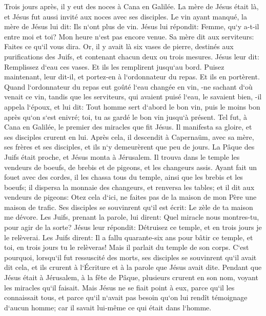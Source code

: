\verse Trois jours après, il y eut des noces à Cana en Galilée. La mère de Jésus était là, 
\verse et Jésus fut aussi invité aux noces avec ses disciples. 
\verse Le vin ayant manqué, la mère de Jésus lui dit: Ils n`ont plus de vin. 
\verse Jésus lui répondit: Femme, qu`y a-t-il entre moi et toi? Mon heure n`est pas encore venue. 
\verse Sa mère dit aux serviteurs: Faites ce qu`il vous dira. 
\verse Or, il y avait là six vases de pierre, destinés aux purifications des Juifs, et contenant chacun deux ou trois mesures. 
\verse Jésus leur dit: Remplissez d`eau ces vases. Et ils les remplirent jusqu`au bord. 
\verse Puisez maintenant, leur dit-il, et portez-en à l`ordonnateur du repas. Et ils en portèrent. 
\verse Quand l`ordonnateur du repas eut goûté l`eau changée en vin, -ne sachant d`où venait ce vin, tandis que les serviteurs, qui avaient puisé l`eau, le savaient bien, -il appela l`époux, 
\verse et lui dit: Tout homme sert d`abord le bon vin, puis le moins bon après qu`on s`est enivré; toi, tu as gardé le bon vin jusqu`à présent. 
\verse Tel fut, à Cana en Galilée, le premier des miracles que fit Jésus. Il manifesta sa gloire, et ses disciples crurent en lui. 
\verse Après cela, il descendit à Capernaüm, avec sa mère, ses frères et ses disciples, et ils n`y demeurèrent que peu de jours. 
\verse La Pâque des Juifs était proche, et Jésus monta à Jérusalem. 
\verse Il trouva dans le temple les vendeurs de boeufs, de brebis et de pigeons, et les changeurs assis. 
\verse Ayant fait un fouet avec des cordes, il les chassa tous du temple, ainsi que les brebis et les boeufs; il dispersa la monnaie des changeurs, et renversa les tables; 
\verse et il dit aux vendeurs de pigeons: Otez cela d`ici, ne faites pas de la maison de mon Père une maison de trafic. 
\verse Ses disciples se souvinrent qu`il est écrit: Le zèle de ta maison me dévore. 
\verse Les Juifs, prenant la parole, lui dirent: Quel miracle nous montres-tu, pour agir de la sorte? 
\verse Jésus leur répondit: Détruisez ce temple, et en trois jours je le relèverai. 
\verse Les Juifs dirent: Il a fallu quarante-six ans pour bâtir ce temple, et toi, en trois jours tu le relèveras! 
\verse Mais il parlait du temple de son corps. 
\verse C`est pourquoi, lorsqu`il fut ressuscité des morts, ses disciples se souvinrent qu`il avait dit cela, et ils crurent à l`Écriture et à la parole que Jésus avait dite. 
\verse Pendant que Jésus était à Jérusalem, à la fête de Pâque, plusieurs crurent en son nom, voyant les miracles qu`il faisait. 
\verse Mais Jésus ne se fiait point à eux, parce qu`il les connaissait tous, 
\verse et parce qu`il n`avait pas besoin qu`on lui rendît témoignage d`aucun homme; car il savait lui-même ce qui était dans l`homme. 

